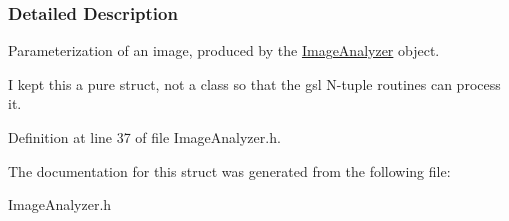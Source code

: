\subsubsection{Detailed Description}
Parameterization of an image, produced by the \hyperlink{classImageAnalyzer}{ImageAnalyzer} object. 

I kept this a pure struct, not a class so that the gsl N-\/tuple routines can process it. 

Definition at line 37 of file ImageAnalyzer.h.



The documentation for this struct was generated from the following file:\begin{DoxyCompactItemize}
\item 
ImageAnalyzer.h\end{DoxyCompactItemize}
